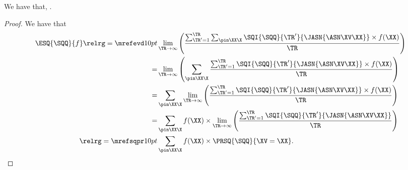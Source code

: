 \begin{proposition}
  We have that, \evsqexprprop.%
\end{proposition}

\begin{proof}
  We have that
  \begin{align*}
    \ESQ{\SQQ}{f} \relrg = {\mrefevd} 10pt &
    \lim_{\TR \rightarrow \infty}\left(\frac{\sum_{\TR' = 1}^{\TR}\sum_{\pin\XX\X}\SQI{\SQQ}{\TR'}{\JASN{\ASN\XV\XX}}\times f(\XX)}{\TR}\right)\\
          = & \lim_{\TR \rightarrow \infty}\left(\sum_{\pin\XX\X}\frac{\sum_{\TR' = 1}^{\TR}\SQI{\SQQ}{\TR'}{\JASN{\ASN\XV\XX}}\times f(\XX)}{\TR}\right)\\
          = & \sum_{\pin\XX\X}\lim_{\TR \rightarrow \infty}\left(\frac{\sum_{\TR' = 1}^{\TR}\SQI{\SQQ}{\TR'}{\JASN{\ASN\XV\XX}}\times f(\XX)}{\TR}\right)\\
          = & \sum_{\pin\XX\X}f(\XX) \times \lim_{\TR \rightarrow \infty}\left(\frac{\sum_{\TR' = 1}^{\TR}\SQI{\SQQ}{\TR'}{\JASN{\ASN\XV\XX}}}{\TR}\right)\\
      \relrg = {\mrefsqpr} 10pt & \sum_{\pin\XX\X}f(\XX) \times \PRSQ{\SQQ}{\XV = \XX}.
  \end{align*}
\end{proof}
